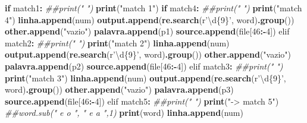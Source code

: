 \documentclass[
  12pt,
]{article}
\newenvironment{Shaded}{\begin{snugshade}}{\end{snugshade}}
\newcommand{\CommentTok}[1]{\textcolor[rgb]{0.56,0.35,0.01}{\textit{#1}}}
\newcommand{\ControlFlowTok}[1]{\textcolor[rgb]{0.13,0.29,0.53}{\textbf{#1}}}
\newcommand{\DecValTok}[1]{\textcolor[rgb]{0.00,0.00,0.81}{#1}}
\newcommand{\KeywordTok}[1]{\textcolor[rgb]{0.13,0.29,0.53}{\textbf{#1}}}
\newcommand{\NormalTok}[1]{#1}
\newcommand{\OperatorTok}[1]{\textcolor[rgb]{0.81,0.36,0.00}{\textbf{#1}}}
\newcommand{\StringTok}[1]{\textcolor[rgb]{0.31,0.60,0.02}{#1}}
\begin{document}
\begin{Shaded}
\begin{Highlighting}[]
                \ControlFlowTok{if}\NormalTok{ match1}\OperatorTok{:}
\StringTok{                        }\CommentTok{##print("   ")}
\StringTok{                        }\KeywordTok{print}\NormalTok{(}\StringTok{"match 1"}\NormalTok{)}
                        \ControlFlowTok{if}\NormalTok{ match4}\OperatorTok{:}
\StringTok{                            }\CommentTok{##print("   ")}
\StringTok{                            }\KeywordTok{print}\NormalTok{(}\StringTok{"match 4"}\NormalTok{)}
                            \KeywordTok{linha.append}\NormalTok{(num)}
                            \KeywordTok{output.append}\NormalTok{(}\KeywordTok{re.search}\NormalTok{(r}\StringTok{'\textbackslash{}d\{9\}'}\NormalTok{, word)}\KeywordTok{.group}\NormalTok{())}
                            \KeywordTok{other.append}\NormalTok{(}\StringTok{"vazio"}\NormalTok{)}
                            \KeywordTok{palavra.append}\NormalTok{(p1)}
                            \KeywordTok{source.append}\NormalTok{(file[}\DecValTok{46}\OperatorTok{:-}\DecValTok{4}\NormalTok{])}
\NormalTok{                elif match2}\OperatorTok{:}
\StringTok{                            }\CommentTok{##print("   ")}
\StringTok{                            }\KeywordTok{print}\NormalTok{(}\StringTok{"match 2"}\NormalTok{)}
                            \KeywordTok{linha.append}\NormalTok{(num)}
                            \KeywordTok{output.append}\NormalTok{(}\KeywordTok{re.search}\NormalTok{(r}\StringTok{'\textbackslash{}d\{9\}'}\NormalTok{, word)}\KeywordTok{.group}\NormalTok{())}
                            \KeywordTok{other.append}\NormalTok{(}\StringTok{"vazio"}\NormalTok{)}
                            \KeywordTok{palavra.append}\NormalTok{(p2)}
                            \KeywordTok{source.append}\NormalTok{(file[}\DecValTok{46}\OperatorTok{:-}\DecValTok{4}\NormalTok{])}
\NormalTok{                elif match3}\OperatorTok{:}
\StringTok{                            }\CommentTok{##print("   ")}
\StringTok{                            }\KeywordTok{print}\NormalTok{(}\StringTok{"match 3"}\NormalTok{)}
                            \KeywordTok{linha.append}\NormalTok{(num)}
                            \KeywordTok{output.append}\NormalTok{(}\KeywordTok{re.search}\NormalTok{(r}\StringTok{'\textbackslash{}d\{9\}'}\NormalTok{, word)}\KeywordTok{.group}\NormalTok{())}
                            \KeywordTok{other.append}\NormalTok{(}\StringTok{"vazio"}\NormalTok{)}
                            \KeywordTok{palavra.append}\NormalTok{(p3)}
                            \KeywordTok{source.append}\NormalTok{(file[}\DecValTok{46}\OperatorTok{:-}\DecValTok{4}\NormalTok{])}
\NormalTok{                elif match5}\OperatorTok{:}
\StringTok{                            }\CommentTok{##print("   ")}
\StringTok{                            }\KeywordTok{print}\NormalTok{(}\StringTok{"-> match 5"}\NormalTok{)}
                            \CommentTok{##word.sub(" e o ", " e a ",1)}
                            \KeywordTok{print}\NormalTok{(word)}
                            \KeywordTok{linha.append}\NormalTok{(num)}
                            

\end{Highlighting}
\end{Shaded}
\end{document}
